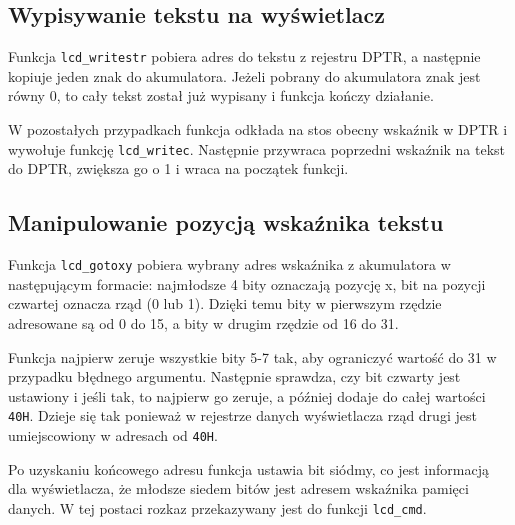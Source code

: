 \documentclass[12pt,a4paper]{article}
\begin{document}
		\subsection{Wypisywanie tekstu na wyświetlacz}
			\begin{minipage}{.5\textwidth}
				
			\end{minipage}%
			\begin{minipage}{.5\textwidth}
				Funkcja \texttt{lcd\_writestr} pobiera adres do tekstu z rejestru DPTR, a następnie kopiuje jeden znak do akumulatora.
				Jeżeli pobrany do akumulatora znak jest równy 0, to cały tekst został już wypisany i funkcja kończy działanie.

				W pozostałych przypadkach funkcja odkłada na stos obecny wskaźnik w DPTR i wywołuje funkcję \texttt{lcd\_writec}.
				Następnie przywraca poprzedni wskaźnik na tekst do DPTR, zwiększa go o 1 i wraca na początek funkcji.
			\end{minipage}

		\subsection{Manipulowanie pozycją wskaźnika tekstu}
			\begin{minipage}{.5\textwidth}
				
			\end{minipage}%
			\begin{minipage}{.5\textwidth}
				Funkcja \texttt{lcd\_gotoxy} pobiera wybrany adres wskaźnika z akumulatora w następującym formacie: najmłodsze 4 bity oznaczają pozycję x, bit na pozycji czwartej oznacza rząd (0 lub 1).
				Dzięki temu bity w pierwszym rzędzie adresowane są od 0 do 15, a bity w drugim rzędzie od 16 do 31.

				Funkcja najpierw zeruje wszystkie bity 5-7 tak, aby ograniczyć wartość do 31 w przypadku błędnego argumentu.
				Następnie sprawdza, czy bit czwarty jest ustawiony i jeśli tak, to najpierw go zeruje, a później dodaje do całej wartości \texttt{40H}.
				Dzieje się tak ponieważ w rejestrze danych wyświetlacza rząd drugi jest umiejscowiony w adresach od \texttt{40H}.

				Po uzyskaniu końcowego adresu funkcja ustawia bit siódmy, co jest informacją dla wyświetlacza, że młodsze siedem bitów jest adresem wskaźnika pamięci danych.
				W tej postaci rozkaz przekazywany jest do funkcji \texttt{lcd\_cmd}.
			\end{minipage}
			
\end{document}
